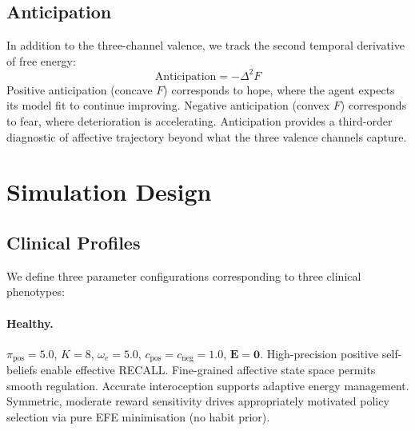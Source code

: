 \documentclass[11pt,a4paper]{article}
\begin{document}
\subsection{Anticipation}

In addition to the three-channel valence, we track the second temporal derivative of free energy:
\begin{equation}
    \text{Anticipation} = -\Delta^2 F
\end{equation}
Positive anticipation (concave $F$) corresponds to hope, where the agent expects its model fit to continue improving. Negative anticipation (convex $F$) corresponds to fear, where deterioration is accelerating. Anticipation provides a third-order diagnostic of affective trajectory beyond what the three valence channels capture.


\section{Simulation Design}\label{sec:simulation}

\subsection{Clinical Profiles}

We define three parameter configurations corresponding to three clinical phenotypes:

\paragraph{Healthy.} $\pi_{\text{pos}} = 5.0$, $K = 8$, $\omega_e = 5.0$, $c_{\text{pos}} = c_{\text{neg}} = 1.0$, $\mathbf{E} = \mathbf{0}$. High-precision positive self-beliefs enable effective RECALL. Fine-grained affective state space permits smooth regulation. Accurate interoception supports adaptive energy management. Symmetric, moderate reward sensitivity drives appropriately motivated policy selection via pure EFE minimisation (no habit prior).
\end{document}
